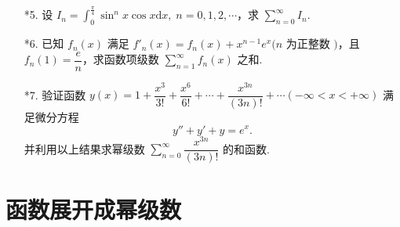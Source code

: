 \begin{enumerate}
    \item[*5.] 设 $\displaystyle I_n=\int_0^{\frac{\pi}{4}}\sin^nx\cos x\text{d}x,\;n=0, 1, 2, \cdots$，求 $\displaystyle \sum_{n=0}^{\infty}I_n$.
    
    \item[*6.] 已知 $f_n(x)$ 满足 $f'_n(x)=f_n(x)+x^{n-1}e^x(n$ 为正整数 $)$，且 $f_n(1)=\dfrac{e}{n}$，求函数项级数 $\displaystyle \sum_{n=1}^{\infty}f_n(x)$ 之和.
    
    \item[*7.] 验证函数 $y(x)=1+\dfrac{x^3}{3!}+\dfrac{x^6}{6!}+\cdots+\dfrac{x^{3n}}{(3n)!}+\cdots(-\infty<x<+\infty)$ 满足微分方程
    \[
        y''+y'+y=e^x.
    \]
    并利用以上结果求幂级数 $\displaystyle \sum_{n=0}^{\infty}\dfrac{x^{3n}}{(3n)!}$ 的和函数. 
\end{enumerate}

\section{函数展开成幂级数}

